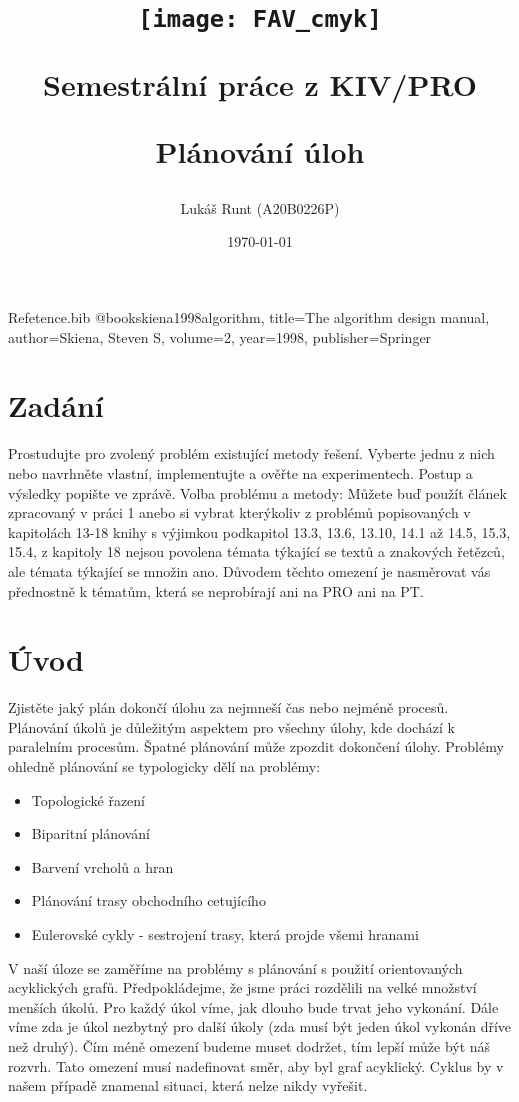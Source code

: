 \documentclass[12pt]{article}
\title{\texttt{[image: FAV\_cmyk]}

{\huge Semestrální práce z KIV/PRO}

\vspace{0.5cm}
{\LARGE Plánování úloh}
\vspace{1cm}
}
\author{Lukáš Runt (A20B0226P)}
\date{\vspace{7.5cm} \today}
\begin{document}
\begin{filecontents}{Refetence.bib}
@book{skiena1998algorithm,
  title={The algorithm design manual},
  author={Skiena, Steven S},
  volume={2},
  year={1998},
  publisher={Springer}
}
\end{filecontents}

\begin{titlepage}
\clearpage\maketitle
\thispagestyle{empty}
\end{titlepage}

\tableofcontents
\newpage
\section{Zadání}
Prostudujte pro zvolený problém existující metody řešení. Vyberte jednu z nich nebo navrhněte vlastní, implementujte a ověřte na experimentech. Postup a výsledky popište ve zprávě.
\newline
\newline Volba problému a metody: Můžete buď použít článek zpracovaný v práci 1 anebo si vybrat kterýkoliv z problémů popisovaných v kapitolách 13-18 knihy \cite{skiena1998algorithm} s výjimkou podkapitol 13.3, 13.6, 13.10, 14.1 až 14.5,  15.3, 15.4, z kapitoly 18 nejsou povolena témata týkající se textů a znakových řetězců, ale témata týkající se množin ano. Důvodem těchto omezení je nasměrovat vás přednostně k tématům, která se neprobírají ani na PRO ani na PT.

\section{Úvod}
Zjistěte jaký plán dokončí úlohu za nejmneší čas nebo nejméně procesů. 
\newline \newline
Plánování úkolů je důležitým aspektem pro všechny úlohy, kde dochází k paralelním procesům. Špatné plánování může zpozdit dokončení úlohy. Problémy ohledně plánování se typologicky dělí na problémy:
\begin{itemize}
  \item Topologické řazení
  \item Biparitní plánování
  \item Barvení vrcholů a hran
  \item Plánování trasy obchodního cetujícího
  \item Eulerovské cykly - sestrojení trasy, která projde všemi hranami 
\end{itemize}
V naší úloze se zaměříme na problémy s plánování s použití orientovaných acyklických grafů. Předpokládejme, že jsme práci rozdělili na velké množství menších úkolů. Pro každý úkol víme, jak dlouho bude trvat jeho vykonání. Dále víme zda je úkol nezbytný pro další úkoly (zda musí být jeden úkol vykonán dříve než druhý). Čím méně omezení budeme muset dodržet, tím lepší může být náš rozvrh. Tato omezení musí nadefinovat směr, aby byl graf acyklický. Cyklus by v našem případě znamenal situaci, která nelze nikdy vyřešit.
\end{document}
